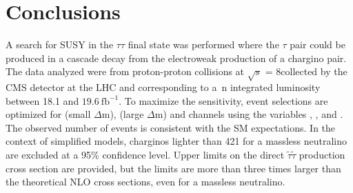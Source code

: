 \section{Conclusions}
\label{sect:conclusion}
A search for SUSY in the $\tau\tau$ final state was performed where the
$\tau$ pair could be produced in a cascade decay from the electroweak production of a chargino pair.  The data analyzed were from proton-proton collisions
at $\sqrt{s}$ = 8\TeV collected by the CMS detector at the LHC and corresponding to a\
n integrated luminosity between 18.1 and $19.6~\mathrm{fb}^{-1}$.%
To maximize the sensitivity, event selections are optimized for \tauTau (small $\Delta$m), 
\tauTau (large $\Delta$m) and \leptonTau channels using the variables \mttwo, \tauMT, and \SumMT.
The observed number of events is consistent with the SM expectations. 
In the context of simplified models, charginos lighter than 421\GeV 
for a massless neutralino are excluded at a 95\% confidence level.
Upper limits on the direct $\tilde{\tau}\tilde{\tau}$ production cross section are provided, but the limits are more than three times
larger than the theoretical NLO cross sections, 
even for a massless neutralino.

